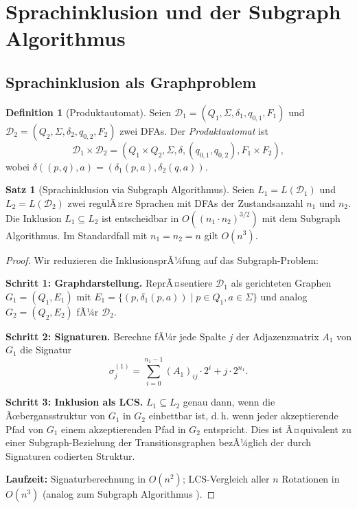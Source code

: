 ﻿\documentclass[a4paper,12pt]{article}
\theoremstyle{definition}
\newtheorem{definition}{Definition}
\newtheorem{satz}{Satz}
\begin{document}
\section{Sprachinklusion und der Subgraph Algorithmus}

\subsection{Sprachinklusion als Graphproblem}

\begin{definition}[Produktautomat]
	Seien $\mathcal{D}_1 = (Q_1, \Sigma, \delta_1, q_{0,1}, F_1)$ und
	$\mathcal{D}_2 = (Q_2, \Sigma, \delta_2, q_{0,2}, F_2)$ zwei DFAs. Der
	\emph{Produktautomat} ist
	\[
		\mathcal{D}_1 \times \mathcal{D}_2 = (Q_1 \times Q_2, \Sigma,
		\delta, (q_{0,1}, q_{0,2}), F_1 \times F_2),
	\]
	wobei $\delta((p, q), a) = (\delta_1(p,a), \delta_2(q,a))$.
\end{definition}

\begin{satz}[Sprachinklusion via Subgraph Algorithmus]
	\label{satz:inklusion}
	Seien $L_1 = L(\mathcal{D}_1)$ und $L_2 = L(\mathcal{D}_2)$ zwei regulÃ¤re
	Sprachen mit DFAs der Zustandsanzahl $n_1$ und $n_2$. Die Inklusion
	$L_1 \subseteq L_2$ ist entscheidbar in $O((n_1 \cdot n_2)^{3/2})$ mit dem
	Subgraph Algorithmus. Im Standardfall mit $n_1 = n_2 = n$ gilt $O(n^3)$.
\end{satz}

\begin{proof}
	Wir reduzieren die InklusionsprÃ¼fung auf das Subgraph-Problem:

	\textbf{Schritt 1: Graphdarstellung.}
	ReprÃ¤sentiere $\mathcal{D}_1$ als gerichteten Graphen $G_1 = (Q_1, E_1)$ mit
	$E_1 = \{(p, \delta_1(p,a)) \mid p \in Q_1, a \in \Sigma\}$ und analog
	$G_2 = (Q_2, E_2)$ fÃ¼r $\mathcal{D}_2$.

	\textbf{Schritt 2: Signaturen.}
	Berechne fÃ¼r jede Spalte $j$ der Adjazenzmatrix $A_1$ von $G_1$ die Signatur
	\[
		\sigma_j^{(1)} = \sum_{i=0}^{n_1-1} (A_1)_{ij} \cdot 2^i + j \cdot 2^{n_1}.
	\]

	\textbf{Schritt 3: Inklusion als LCS.}
	$L_1 \subseteq L_2$ genau dann, wenn die Ãœbergansstruktur von $G_1$ in $G_2$
	einbettbar ist, d.\,h. wenn jeder akzeptierende Pfad von $G_1$ einem
	akzeptierenden Pfad in $G_2$ entspricht. Dies ist Ã¤quivalent zu einer
	Subgraph-Beziehung der Transitionsgraphen bezÃ¼glich der durch Signaturen
	codierten Struktur.

	\textbf{Laufzeit:} Signaturberechnung in $O(n^2)$; LCS-Vergleich aller
	$n$ Rotationen in $O(n^3)$ (analog zum Subgraph Algorithmus \cite{epp2026}).
	\qedhere
\end{proof}
\end{document}
